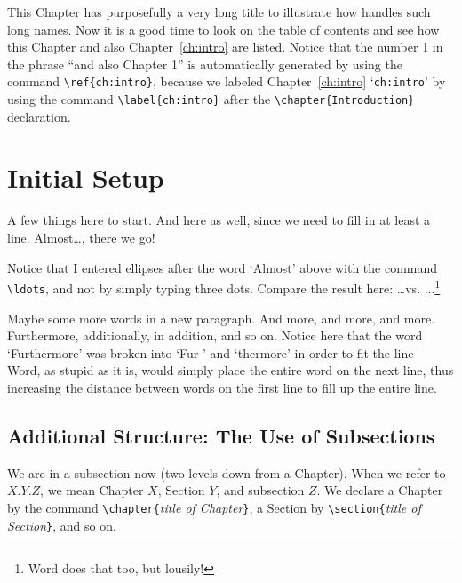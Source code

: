 
This Chapter has purposefully a very long title to illustrate how
\LaTeXe{} handles such long names. Now it is a good time to look on
the table of contents and see how this Chapter and also
Chapter~\ref{ch:intro} are listed. Notice that the number 1 in the
phrase ``and also Chapter 1'' is automatically generated by using
the command \verb|\ref{ch:intro}|, because we labeled
Chapter~\ref{ch:intro} `\verb|ch:intro|' by using the command
\verb|\label{ch:intro}| after the \verb|\chapter{Introduction}|
declaration.

\section{Initial Setup}
A few things here to start. And here as well, since we need to fill
in at least a line. Almost\ldots, there we go!

Notice that I entered ellipses after the word `Almost' above with
the command \verb|\ldots|, and not by simply typing three dots.
Compare the result here: \ldots vs. ...\footnote{Word does that too,
but lousily!}

Maybe some more words in a new paragraph. And more, and more, and
more. Furthermore, additionally, in addition, and so on. Notice here
that the word `Furthermore' was broken into `Fur-' and `thermore' in
order to fit the line---Word, as stupid as it is, would simply place
the entire word on the next line, thus increasing the distance
between words on the first line to fill up the entire line.

\subsection{Additional Structure: The Use of Subsections}
\label{sec:structure} We are in a subsection now (two levels down
from a Chapter). When we refer to $X.Y.Z$, we mean Chapter $X$,
Section $Y$, and subsection $Z$. We declare a Chapter by the command
\verb|\chapter{|\emph{title of Chapter}\verb|}|, a Section by
\verb|\section{|\emph{title of Section}\verb|}|, and so on.

